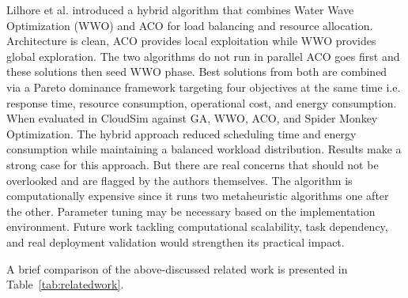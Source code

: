 \documentclass[pdflatex,sn-mathphys-num]{sn-jnl}%
\begin{document}
Lilhore et al. \cite{lilhore2025} introduced a hybrid algorithm that combines Water Wave Optimization (WWO) and ACO for load balancing and resource allocation. Architecture is clean, ACO provides local exploitation while WWO provides global exploration. The two algorithms do not run in parallel ACO goes first and these solutions then seed WWO phase. Best solutions from both are combined via a Pareto dominance framework targeting four objectives at the same time i.e. response time, resource consumption, operational cost, and energy consumption. When evaluated in CloudSim against GA, WWO, ACO, and Spider Monkey Optimization. The hybrid approach reduced scheduling time and energy consumption while maintaining a balanced workload distribution. Results make a strong case for this approach. But there are real concerns that should not be overlooked and are flagged by the authors themselves. The algorithm is computationally expensive since it runs two metaheuristic algorithms one after the other. Parameter tuning may be necessary based on the implementation environment. Future work tackling computational scalability, task dependency, and real deployment validation would strengthen its practical impact.


\singlespacing \noindent A brief comparison of the above-discussed related work is presented in Table~\ref{tab:relatedwork}.
\end{document}
